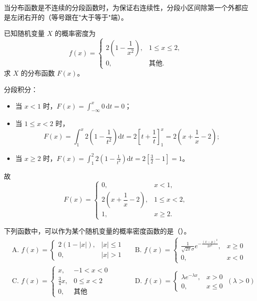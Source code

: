 \documentclass[lang=cn,11pt]{elegantbook}
\begin{document}
\begin{note}
当分布函数是不连续的分段函数时，为保证右连续性，分段小区间除第一个外都应是左闭右开的（等号跟在"大于等于"端）。
\end{note}

\begin{exercise}\label{exer:2-7}
已知随机变量 $X$ 的概率密度为
\[
f(x) = \begin{cases}
2\left(1 - \dfrac{1}{x^2}\right), & 1 \le x \le 2, \\
0, & \text{其他}.
\end{cases}
\]
求 $X$ 的分布函数 $F(x)$。
\end{exercise}

\begin{solution}
分段积分：
\begin{itemize}
    \item 当 $x < 1$ 时，$F(x) = \displaystyle\int_{-\infty}^x 0\,\mathrm{d}t = 0$；
    \item 当 $1 \le x < 2$ 时，
    \[
    F(x) = \int_1^x 2\left(1 - \frac{1}{t^2}\right)\mathrm{d}t = 2\left[t + \frac{1}{t}\right]_1^x = 2\left(x + \frac{1}{x} - 2\right);
    \]
    \item 当 $x \ge 2$ 时，$F(x) = \displaystyle\int_1^2 2\left(1 - \frac{1}{t^2}\right)\mathrm{d}t = 2\left[\frac{3}{2} - 1\right] = 1$。
\end{itemize}
故
\[
F(x) = \begin{cases}
0, & x < 1, \\
2\left(x + \dfrac{1}{x} - 2\right), & 1 \le x < 2, \\
1, & x \ge 2.
\end{cases}
\]
\end{solution}

\begin{exercise}\label{exer:2-23}
下列函数中，可以作为某个随机变量的概率密度函数的是（\quad）。
\begin{align*}
&\text{A. } f(x) = \begin{cases} 2(1-|x|), & |x| \le 1 \\ 0, & |x|>1 \end{cases}
&&\text{B. } f(x) = \begin{cases} \frac{1}{\sqrt{2\pi}\sigma} e^{-\frac{(x-\mu)^2}{2\sigma^2}}, & x \ge 0 \\ 0, & x<0 \end{cases} \\
&\text{C. } f(x) = \begin{cases} x, & -1<x<0 \\ \frac{3}{4}x, & 0 \le x<2 \\ 0, & \text{其他} \end{cases}
&&\text{D. } f(x) = \begin{cases} \lambda e^{-\lambda x}, & x>0 \\ 0, & x \le 0 \end{cases} \ (\lambda>0)
\end{align*}
\end{exercise}
\end{document}
